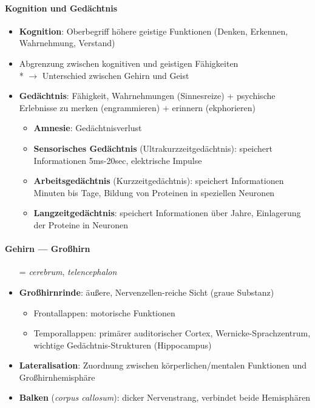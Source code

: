 \paragraph{Kognition und Gedächtnis}
\begin{itemize}
  \item \textbf{Kognition}: Oberbegriff höhere geistige Funktionen (Denken, Erkennen, Wahrnehmung, Verstand)
  \item Abgrenzung zwischen kognitiven und geistigen Fähigkeiten \\* \( \to \) Unterschied zwischen Gehirn und Geist
  \item \textbf{Gedächtnis}: Fähigkeit, Wahrnehmungen (Sinnesreize) + psychische Erlebnisse zu merken (engrammieren) + erinnern (ekphorieren)
  \begin{itemize}
    \item \textbf{Amnesie}: Gedächtnisverlust
    \item \textbf{Sensorisches Gedächtnis} (Ultrakurzzeitgedächtnis): speichert Informationen 5ms-20sec, elektrische Impulse
    \item \textbf{Arbeitsgedächtnis} (Kurzzeitgedächtnis): speichert Informationen Mi\-nu\-ten bis Tage, Bildung von Proteinen in speziellen Neuronen
    \item \textbf{Langzeitgedächtnis}: speichert Informationen über Jahre, Einlagerung der Proteine in Neuronen
  \end{itemize}
\end{itemize}

\paragraph{Gehirn --- Großhirn}
\begin{itemize}
  \item[=] \emph{cerebrum}, \emph{telencephalon}
  \item \textbf{Großhirnrinde}: äußere, Nervenzellen-reiche Sicht (graue Substanz)
  \begin{itemize}
    \item Frontallappen: motorische Funktionen
    \item Temporallappen: primärer auditorischer Cortex, Wernicke-Sprachzentrum, wichtige Gedächtnis-Strukturen (Hippocampus)
  \end{itemize}
  \item \textbf{Lateralisation}: Zuordnung zwischen körperlichen/mentalen Funktionen und Großhirnhemisphäre
  \item \textbf{Balken} (\emph{corpus callosum}): dicker Nervenstrang, verbindet beide Hemisphären
\end{itemize}

